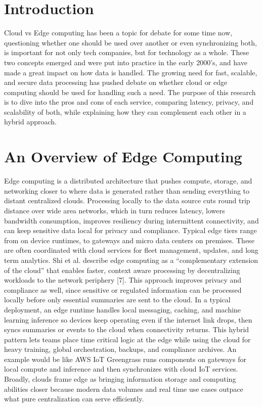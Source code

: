 \documentclass[conference]{IEEEtran}
\begin{document}
{\section{Introduction}

Cloud vs Edge computing has been a topic for debate for some time now, questioning whether one should be used over another or even synchronizing both, is important for not only tech companies, but for technology as a whole. These two concepts emerged and were put into practice in the early 2000’s, and have made a great impact on how data is handled. The growing need for fast, scalable, and secure data processing has pushed debate on whether cloud or edge computing should be used for handling such a need. The purpose of this research is to dive into the pros and cons of each service, comparing latency, privacy, and scalability of both, while explaining how they can complement each other in a hybrid approach. 

\section{An Overview of Edge Computing}

Edge computing is a distributed architecture that pushes compute, storage, and networking closer to where data is generated rather than sending everything to distant centralized clouds. Processing locally to the data source cuts round trip distance over wide area networks, which in turn reduces latency, lowers bandwidth consumption, improves resiliency during intermittent connectivity, and can keep sensitive data local for privacy and compliance. Typical edge tiers range from on device runtimes, to gateways and micro data centers on premises. These are often coordinated with cloud services for fleet management, updates, and long term analytics. Shi et al. describe edge computing as a “complementary extension of the cloud” that enables faster, context aware processing by decentralizing workloads to the network periphery [7]. This approach improves privacy and compliance as well, since sensitive or regulated information can be processed locally before only essential summaries are sent to the cloud.
In a typical deployment, an edge runtime handles local messaging, caching, and machine learning inference so devices keep operating even if the internet link drops, then syncs summaries or events to the cloud when connectivity returns. This hybrid pattern lets teams place time critical logic at the edge while using the cloud for heavy training, global orchestration, backups, and compliance archives. An example would be like AWS IoT Greengrass runs components on gateways for local compute and inference and then synchronizes with cloud IoT services. Broadly, clouds frame edge as bringing information storage and computing abilities closer because modern data volumes and real time use cases outpace what pure centralization can serve efficiently.


}
\end{document}
